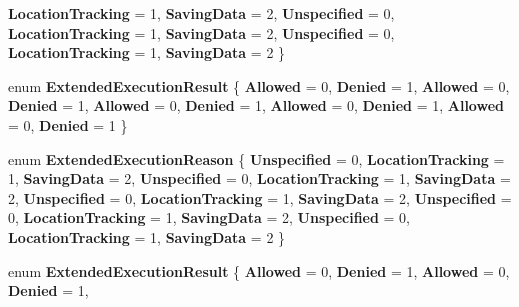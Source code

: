 \begin{DoxyCompactItemize}
{\bfseries Location\+Tracking} = 1, 
\newline
{\bfseries Saving\+Data} = 2, 
{\bfseries Unspecified} = 0, 
{\bfseries Location\+Tracking} = 1, 
{\bfseries Saving\+Data} = 2, 
\newline
{\bfseries Unspecified} = 0, 
{\bfseries Location\+Tracking} = 1, 
{\bfseries Saving\+Data} = 2
 \}
\item 
\mbox{\label{namespace_windows_1_1_application_model_1_1_extended_execution_a24027557babcb8bc4950e24a373e5677}} 
enum {\bfseries Extended\+Execution\+Result} \{ \newline
{\bfseries Allowed} = 0, 
{\bfseries Denied} = 1, 
{\bfseries Allowed} = 0, 
{\bfseries Denied} = 1, 
\newline
{\bfseries Allowed} = 0, 
{\bfseries Denied} = 1, 
{\bfseries Allowed} = 0, 
{\bfseries Denied} = 1, 
\newline
{\bfseries Allowed} = 0, 
{\bfseries Denied} = 1
 \}
\item 
\mbox{\label{namespace_windows_1_1_application_model_1_1_extended_execution_ad0dba54dc24164e0c6d2e0a29d818528}} 
enum {\bfseries Extended\+Execution\+Reason} \{ \newline
{\bfseries Unspecified} = 0, 
{\bfseries Location\+Tracking} = 1, 
{\bfseries Saving\+Data} = 2, 
{\bfseries Unspecified} = 0, 
\newline
{\bfseries Location\+Tracking} = 1, 
{\bfseries Saving\+Data} = 2, 
{\bfseries Unspecified} = 0, 
{\bfseries Location\+Tracking} = 1, 
\newline
{\bfseries Saving\+Data} = 2, 
{\bfseries Unspecified} = 0, 
{\bfseries Location\+Tracking} = 1, 
{\bfseries Saving\+Data} = 2, 
\newline
{\bfseries Unspecified} = 0, 
{\bfseries Location\+Tracking} = 1, 
{\bfseries Saving\+Data} = 2
 \}
\item 
\mbox{\label{namespace_windows_1_1_application_model_1_1_extended_execution_a24027557babcb8bc4950e24a373e5677}} 
enum {\bfseries Extended\+Execution\+Result} \{ \newline
{\bfseries Allowed} = 0, 
{\bfseries Denied} = 1, 
{\bfseries Allowed} = 0, 
{\bfseries Denied} = 1, 
\newline

\end{DoxyCompactItemize}
